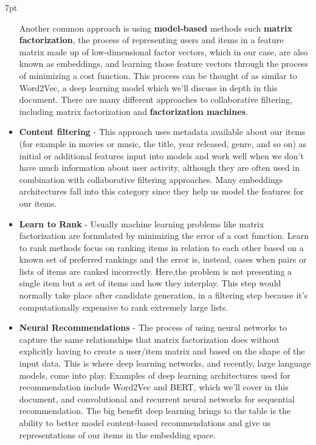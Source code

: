 \documentclass[11pt, table]{diazessay} %
\newenvironment{formal}{%
  \def\FrameCommand{%
	\hspace{1pt}%
	{\color{w_lightblue}\vrule width 2pt}%
	{\color{formalshade}\vrule width 4pt}%
	\colorbox{formalshade}%
  }%
  \MakeFramed{\advance\hsize-\width\FrameRestore}%
  \noindent\hspace{-4.55pt}%
  \begin{adjustwidth}{}{7pt}%
  \vspace{2pt}\vspace{2pt}%
}
{%
  \vspace{2pt}\end{adjustwidth}\endMakeFramed%
}
\begin{document}
\begin{sloppypar}
\begin{formal}
\begin{itemize}
  Another common approach is using \textbf{model-based} methods such  \textbf{matrix factorization}, the process of representing users and items in a feature matrix made up of low-dimensional factor vectors, which in our case, are also known as embeddings, and learning those feature vectors through the process of minimizing a cost function. This process can be thought of as similar to Word2Vec\citep{levy2014neural}, a deep learning model which we'll discuss in depth in this document.  There are many different approaches to collaborative filtering, including matrix factorization and  \textbf{factorization machines}.
   \item \textbf{Content filtering} - This approach uses metadata available about our items (for example in movies or music, the title, year released, genre, and so on) as initial or additional features input into models and work well when we don't have much information about user activity, although they are often used in combination with collaborative filtering approaches. Many embeddings architectures fall into this category since they help us model the features for our items.  
  \item \textbf{Learn to Rank} - Usually machine learning problems like matrix factorization are formulated by minimizing the error of a cost function. Learn to rank methods focus on ranking items in relation to each other based on a known set of preferred rankings and the error is, instead, cases when pairs or lists of items are ranked incorrectly. Here,the problem is not presenting a single item but a set of items and how they interplay. This step would normally take place after candidate generation, in a filtering step because it's computationally expensive to rank extremely large lists.
  \item \textbf{Neural Recommendations} - The process of using neural networks to capture the same relationships that matrix factorization does without explicitly having to create a user/item matrix and based on the shape of the input data. This is where deep learning networks, and recently, large language models, come into play. Examples of deep learning architectures used for recommendation include Word2Vec and BERT, which we'll cover in this document, and convolutional and recurrent neural networks for sequential recommendation. The big benefit deep learning brings to the table is the ability to better model content-based recommendations and give us representations of our items in the embedding space.\citep{zhang2019deep}
\end{itemize}
\end{formal}


\end{sloppypar}
\end{document}
